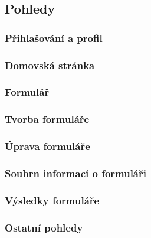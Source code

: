 	\subsection{Pohledy}
		
		\subsubsection{Přihlašování a profil}
		
		\subsubsection{Domovská stránka}
		
		\subsubsection{Formulář}
		
		\subsubsection{Tvorba formuláře}
		
		\subsubsection{Úprava formuláře}
		
		\subsubsection{Souhrn informací o formuláři}
		
		\subsubsection{Výsledky formuláře}
		
		\subsubsection{Ostatní pohledy}
